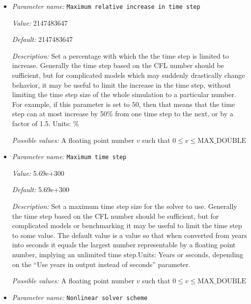 \begin{itemize}
{\it Possible values:} A floating point number $v$ such that $0 \leq v \leq \text{MAX\_DOUBLE}$
\item {\it Parameter name:} {\tt Maximum relative increase in time step}
\label{parameters:Maximum relative increase in time step}
\label{parameters:Maximum_20relative_20increase_20in_20time_20step}


{\it Value:} 2147483647


{\it Default:} 2147483647


{\it Description:} Set a percentage with which the the time step is limited to increase. Generally the time step based on the CFL number should be sufficient, but for complicated models which may suddenly drastically change behavior, it may be useful to limit the increase in the time step, without limiting the time step size of the whole simulation to a particular number. For example, if this parameter is set to $50$, then that means that the time step can at most increase by 50\% from one time step to the next, or by a factor of 1.5. Units: \%


{\it Possible values:} A floating point number $v$ such that $0 \leq v \leq \text{MAX\_DOUBLE}$
\item {\it Parameter name:} {\tt Maximum time step}
\label{parameters:Maximum time step}
\label{parameters:Maximum_20time_20step}


{\it Value:} 5.69e+300


{\it Default:} 5.69e+300


{\it Description:} Set a maximum time step size for the solver to use. Generally the time step based on the CFL number should be sufficient, but for complicated models or benchmarking it may be useful to limit the time step to some value. The default value is a value so that when converted from years into seconds it equals the largest number representable by a floating point number, implying an unlimited time step.Units: Years or seconds, depending on the ``Use years in output instead of seconds'' parameter.


{\it Possible values:} A floating point number $v$ such that $0 \leq v \leq \text{MAX\_DOUBLE}$
\item {\it Parameter name:} {\tt Nonlinear solver scheme}
\label{parameters:Nonlinear solver scheme}
\label{parameters:Nonlinear_20solver_20scheme}



\end{itemize}
